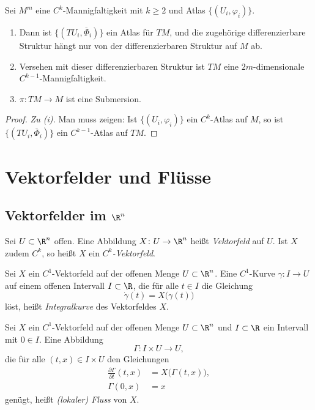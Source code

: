 \documentclass[11pt]{article}
\begin{document}
\begin{proposition}\Theorem
  Sei $M^m$ eine $C^k$-Mannigfaltigkeit mit $k \ge 2$ und Atlas $\{(U_i, \varphi_i)\}$.
  \begin{enumerate}[label=(\roman*)]
    \item Dann ist $\{(TU_i, \overline{\Phi}_i)\}$ ein Atlas für $TM$, und die zugehörige differenzierbare Struktur hängt nur von der differenzierbaren Struktur auf $M$ ab.
    \item Versehen mit dieser differenzierbaren Struktur ist $TM$ eine $2m$-dimensionale $C^{k-1}$-Mannigfaltigkeit.
    \item $\pi \colon TM \longrightarrow M$ ist eine Submersion.
  \end{enumerate}
\end{proposition}


\begin{proof}
  \textit{Zu (i).} Man muss zeigen: Ist $\{(U_i, \varphi_i)\}$ ein $C^k$-Atlas auf $M$, so ist $\{(TU_i, \overline{\Phi}_i)\}$ ein $C^{k-1}$-Atlas auf $TM$.
\end{proof}


\section{Vektorfelder und Flüsse}

\subsection{Vektorfelder im \texorpdfstring{$\R^n$}{Rn}}

\begin{definition}[Vektorfeld]\Theorem
  Sei $U \subset \R^n$ offen. Eine Abbildung $X\colon U \to \R^n$ heißt \emph{Vektorfeld} auf $U$. Ist $X$ zudem $C^k$, so heißt $X$ ein \emph{$C^k$-Vektorfeld}.
\end{definition}


\begin{definition}[Integralkurve]\Theorem
  Sei $X$ ein $C^1$-Vektorfeld auf der offenen Menge $U \subset \R^n$. Eine $C^1$-Kurve $\gamma\colon I \to U$ auf einem offenen Intervall $I \subset \R$, die für alle $t \in I$ die Gleichung
  \[ \dot{\gamma}(t) = X\bigl(\gamma(t)\bigr) \]
  löst, heißt \emph{Integralkurve} des Vektorfeldes $X$.
\end{definition}


\begin{definition}[Fluss]\Theorem
  Sei $X$ ein $C^1$-Vektorfeld auf der offenen Menge $U \subset \R^n$ und $I \subset \R$ ein Intervall mit $0 \in I$. Eine Abbildung
  \[ \Gamma\colon I \times U \to U, \]
  die für alle $(t, x) \in I \times U$ den Gleichungen
  \begin{align*}
    \frac{\partial \Gamma}{\partial t}(t, x) &= X\bigl(\Gamma(t, x)\bigr), \\
    \Gamma(0, x) &= x
  \end{align*}
  genügt, heißt \emph{(lokaler) Fluss} von $X$.
\end{definition}
\end{document}

